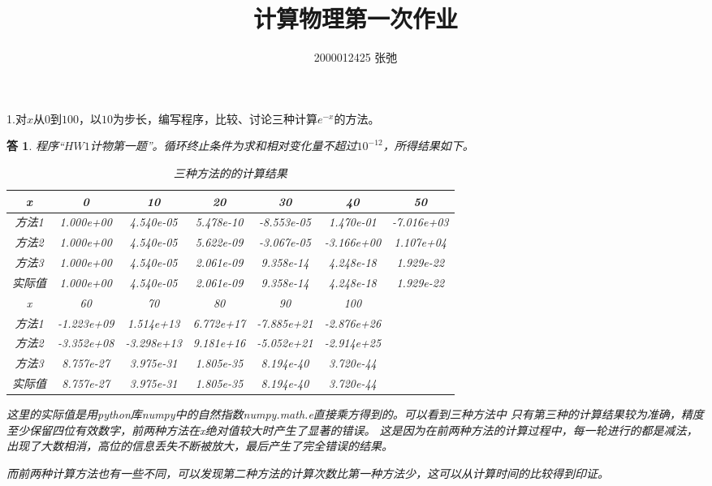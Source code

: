 \documentclass[10pt]{ctexart}
\author{2000012425 张弛}
\title{计算物理第一次作业}
\newtheorem*{answer}{答}
\begin{document}
\maketitle
1.对$x$从$0$到$100$，以$10$为步长，编写程序，比较、讨论三种计算$e^{-x}$的方法。
\begin{answer}
程序“$HW1$计物第一题”。循环终止条件为求和相对变化量不超过$10^{-12}$，所得结果如下。

\begin{table}[h]
\centering
\begin{tabular}{ccccccc}
\toprule
x & 0 & 10 & 20 & 30 & 40 & 50 \\
\midrule
方法1 & 1.000e+00 & 4.540e-05 &5.478e-10 & -8.553e-05 &1.470e-01 &-7.016e+03 \\
方法2 & 1.000e+00 & 4.540e-05 & 5.622e-09 & -3.067e-05 & -3.166e+00 & 1.107e+04 \\
方法3 & 1.000e+00 & 4.540e-05 & 2.061e-09 & 9.358e-14 & 4.248e-18  & 1.929e-22 \\
实际值 & 1.000e+00 & 4.540e-05 & 2.061e-09 &  9.358e-14 & 4.248e-18 & 1.929e-22\\
\bottomrule
\toprule
    x &60 & 70 & 80 & 90 &100& \\
    \midrule
    方法1 & -1.223e+09 & 1.514e+13 &6.772e+17 & -7.885e+21 &-2.876e+26& \\
    方法2 & -3.352e+08 & -3.298e+13 & 9.181e+16 & -5.052e+21 & -2.914e+25 &  \\
    方法3 &  8.757e-27 & 3.975e-31 & 1.805e-35 & 8.194e-40 & 3.720e-44  &  \\
    实际值 & 8.757e-27 & 3.975e-31 & 1.805e-35 &  8.194e-40 & 3.720e-44 & \\
    \bottomrule
    \end{tabular}
\caption{三种方法的的计算结果}
\end{table}

这里的实际值是用python库numpy中的自然指数numpy.math.e直接乘方得到的。可以看到三种方法中
只有第三种的计算结果较为准确，精度至少保留四位有效数字，前两种方法在x绝对值较大时产生了显著的错误。
这是因为在前两种方法的计算过程中，每一轮进行的都是减法，出现了大数相消，高位的信息丢失不断被放大，最后产生了完全错误的结果。

而前两种计算方法也有一些不同，可以发现第二种方法的计算次数比第一种方法少，这可以从计算时间的比较得到印证。


\end{answer}
\end{document}
